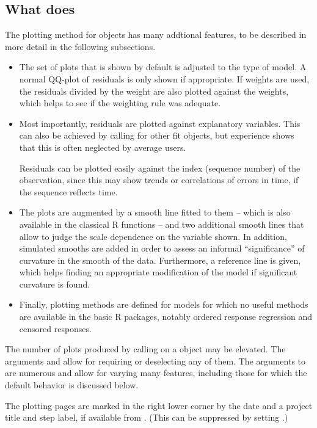 \documentclass[11pt]{article}
\begin{document}
\subsection{What  does}
The plotting method for  objects has many addtional features, to be
described in more detail in the following subsections.
\begin{itemize}
\item
The set of plots that is shown by default is adjusted to the type of
model. A normal QQ-plot of residuals is only shown if appropriate.
If weights are used, the residuals divided by the weight 
are also plotted against the
weights, which helps to see if the weighting rule was adequate.
\item 
Most importantly, residuals are plotted against explanatory variables.
This can also be achieved by calling  for other fit objects,  
but experience shows that this is often neglected by average users.

Residuals can be plotted easily against the index (sequence
number) of the observation, since this may show trends or 
correlations of errors in time, if the sequence reflects time.
\item
The plots are augmented by a smooth line fitted to them -- which is also
available in the classical R functions -- and two additional smooth lines
that allow to judge the scale dependence on the variable shown.
In addition, simulated smooths are added in order to assess an informal 
``significance'' of curvature in the smooth of the data. 
Furthermore, a reference line is given, which helps finding
an appropriate modification of the model if significant curvature is
found. 
\item
Finally, plotting methods are defined for models for which no useful 
methods are available in the basic R packages, notably ordered response
regression and censored responses.
\end{itemize}

The number of plots produced by calling  on a  object may
be elevated. The arguments  and  allow for 
requiring or deselecting any of them. 
The arguments to  are numerous and allow for varying many
features, including those for which the default behavior is discussed below.

The plotting pages are marked in the right lower corner by the date and a
project title and step label, if available from . 
(This  can be suppressed by setting .) 
\end{document}

